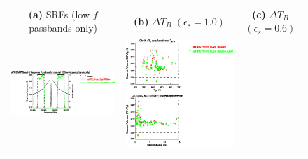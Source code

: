 \begin{figure}[H]
  \centering
  \begin{tabular}{c c c}
    \textsf{\textbf{(a)} SRFs (low $f$ passbands only)} &
    \textsf{\textbf{(b)} $\Delta T_B$ $(\epsilon_s = 1.0)$} &
    \textsf{\textbf{(c)} $\Delta T_B$ $(\epsilon_s = 0.6)$} \\
    \includegraphics[bb=80 400 280 558,clip,scale=0.85]{graphics/srf/Rset/atms_npp.ch15.osrf.eps} &
    \includegraphics[bb=85 400 260 558,clip,scale=0.85]{graphics/dtb/Rset/e1.0_r0.0/atms_npp.ch15.dTb.eps} & 

\end{tabular}
\end{figure}
